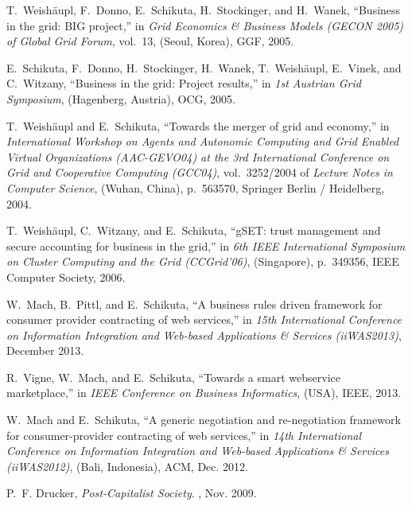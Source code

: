 \documentclass[]{article}
\begin{document}
\begin{thebibliography}{10}

T.~Weish\"{a}upl, F.~Donno, E.~Schikuta, H.~Stockinger, and H.~Wanek,
  ``Business in the grid: {BIG} project,'' in {\em Grid Economics \& Business
  Models (GECON 2005) of Global Grid Forum}, vol.~13, (Seoul, Korea), {GGF},
  2005.

E.~Schikuta, F.~Donno, H.~Stockinger, H.~Wanek, T.~Weish\"{a}upl, E.~Vinek, and
  C.~Witzany, ``Business in the grid: Project results,'' in {\em 1st Austrian
  Grid Symposium}, (Hagenberg, Austria), {OCG}, 2005.

T.~Weish\"{a}upl and E.~Schikuta, ``Towards the merger of grid and economy,''
  in {\em International Workshop on Agents and Autonomic Computing and Grid
  Enabled Virtual Organizations {(AAC-GEVO04)} at the 3rd International
  Conference on Grid and Cooperative Computing {(GCC04)}}, vol.~3252/2004 of
  {\em Lecture Notes in Computer Science}, (Wuhan, China),
  p.~563{\textendash}570, Springer Berlin / Heidelberg, 2004.

T.~Weish\"{a}upl, C.~Witzany, and E.~Schikuta, ``{gSET:} trust management and
  secure accounting for business in the grid,'' in {\em 6th {IEEE}
  International Symposium on Cluster Computing and the Grid {(CCGrid'06)}},
  (Singapore), p.~349{\textendash}356, {IEEE} Computer Society, 2006.

W.~Mach, B.~Pittl, and E.~Schikuta, ``A business rules driven framework for
  consumer provider contracting of web services,'' in {\em 15th International
  Conference on Information Integration and Web-based Applications \& Services
  (iiWAS2013)}, December 2013.

R.~Vigne, W.~Mach, and E.~Schikuta, ``Towards a smart webservice marketplace,''
  in {\em IEEE Conference on Business Informatics}, (USA), IEEE, 2013.

W.~Mach and E.~Schikuta, ``A generic negotiation and re-negotiation framework
  for consumer-provider contracting of web services,'' in {\em 14th
  International Conference on Information Integration and Web-based
  Applications \& Services (iiWAS2012)}, (Bali, Indonesia), ACM, Dec. 2012.

P.~F. Drucker, {\em {Post-Capitalist} Society}.
, Nov. 2009.


\end{thebibliography}
\end{document}
